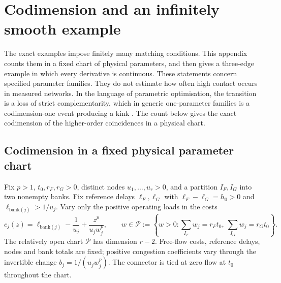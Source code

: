 \section{Codimension and an infinitely smooth example}\label{app:geometry}

The exact examples impose finitely many matching conditions. This appendix counts them in a fixed chart of physical parameters, and then gives a three-edge example in which every derivative is continuous. These statements concern specified parameter families. They do not estimate how often high contact occurs in measured networks. In the language of parametric optimisation, the transition is a loss of strict complementarity, which in generic one-parameter families is a codimension-one event producing a kink \cite{JongenJonkerTwilt1986}. The count below gives the exact codimension of the higher-order coincidences in a physical chart.

\subsection{Codimension in a fixed physical parameter chart}

Fix $p>1$, $t_0,r_F,r_G>0$, distinct nodes $u_1,\ldots,u_r>0$, and a partition $I_F,I_G$ into two nonempty banks. Fix reference delays $\ell_F,\ell_G$ with $\ell_F-\ell_G=h_0>0$ and $\ell_{\mathrm{bank}(j)}>1/u_j$. Vary only the positive operating loads in the costs
\begin{equation}\label{eq:physicalchart}
 c_j(z)=\ell_{\mathrm{bank}(j)}-\frac1{u_j}+
         \frac{z^p}{u_j w_j^p},\qquad
 w\in\mathcal P:=\left\{w>0:
 \sum_{I_F}w_j=r_Ft_0,\ \sum_{I_G}w_j=r_Gt_0\right\}.
\end{equation}
The relatively open chart $\mathcal P$ has dimension $r-2$. Free-flow costs, reference delays, nodes and bank totals are fixed; positive congestion coefficients vary through the invertible change $b_j=1/(u_jw_j^p)$. The connector is tied at zero flow at $t_0$ throughout the chart.

